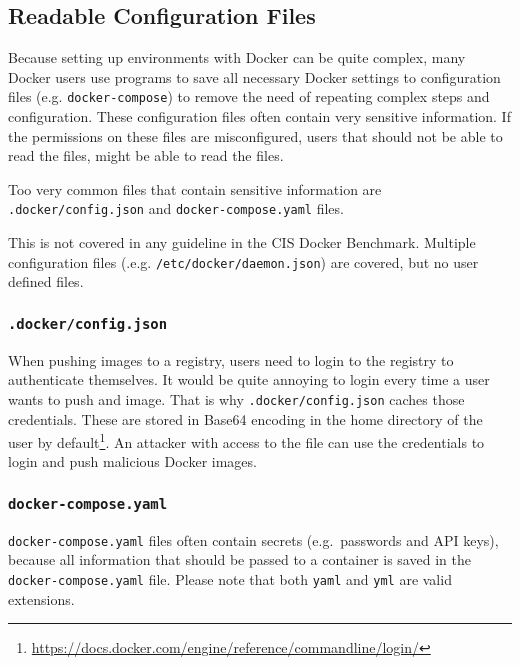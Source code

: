 \subsection{Readable Configuration Files}\label{subsection:config-files}
Because setting up environments with Docker can be quite complex, many Docker users use programs to save all necessary Docker settings to configuration files (e.g. \lstinline{docker-compose}) to remove the need of repeating complex steps and configuration. These configuration files often contain very sensitive information. If the permissions on these files are misconfigured, users that should not be able to read the files, might be able to read the files.

Too very common files that contain sensitive information are \lstinline{.docker/config.json} and \lstinline{docker-compose.yaml} files.

\medskip

This is not covered in any guideline in the CIS Docker Benchmark. Multiple configuration files (.e.g. \lstinline{/etc/docker/daemon.json}) are covered, but no user defined files.

\subsubsection{\texorpdfstring{\lstinline{.docker/config.json}}{.docker/config.json}}
When pushing images to a registry, users need to login to the registry to authenticate themselves.
It would be quite annoying to login every time a user wants to push and image. That is why \lstinline{.docker/config.json} caches those credentials. These are stored in Base64 encoding in the home directory of the user by default\footnote{\url{https://docs.docker.com/engine/reference/commandline/login/}}. An attacker with access to the file can use the credentials to login and push malicious Docker images\cite{Docker-Credentials-Metasploit}.

\subsubsection{\texorpdfstring{\lstinline{docker-compose.yaml}}{docker-compose.yaml}}
\lstinline{docker-compose.yaml} files often contain secrets (e.g.\ passwords and API keys), because all information that should be passed to a container is saved in the \lstinline{docker-compose.yaml} file. Please note that both \lstinline{yaml} and \lstinline{yml} are valid extensions.
